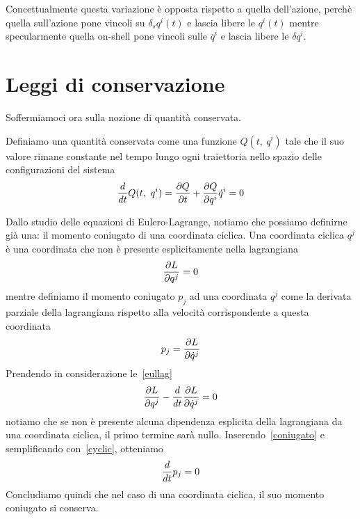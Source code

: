     Concettualmente questa variazione è opposta rispetto a quella dell'azione, perchè quella sull'azione pone vincoli su $\delta_s q^i(t)$ e lascia libere le $q^i(t)$ mentre specularmente quella on-shell pone vincoli sulle $\overline q^i$ e lascia libere le $\delta q^i$.

\section{Leggi di conservazione}
    Soffermiamoci ora sulla nozione di quantità conservata. 
    \begin{definition}
        Definiamo una quantità conservata come una funzione $Q(t, ~q^i)$ tale che il suo valore rimane constante nel tempo lungo ogni traiettoria nello spazio delle configurazioni del sistema
    \begin{equation*}
        \frac{d}{dt} Q(t, ~q^i) = \frac{\partial Q}{\partial t} + \frac{\partial Q}{\partial q^i} \dot q^i = 0
    \end{equation*}
    \end{definition} 

    Dallo studio delle equazioni di Eulero-Lagrange, notiamo che possiamo definirne già una: il momento coniugato di una coordinata ciclica. Una coordinata ciclica $q^j$ è una coordinata che non è presente esplicitamente nella lagrangiana
    \begin{equation} \label{cyclic}
        \frac{\partial L}{\partial q^j} = 0
    \end{equation}
    mentre definiamo il momento coniugato $p_j$ ad una coordinata $q^j$ come la derivata parziale della lagrangiana rispetto alla velocità corrispondente a questa coordinata
    \begin{equation} \label{coniugato}
        p_j = \frac{\partial L}{\partial\dot q^j}
    \end{equation}
    Prendendo in considerazione le~\eqref{eullag}
    \begin{equation*}
        \frac{\partial L}{\partial q^j}  - \frac{d}{dt} \frac{\partial L}{\partial\dot q^j} = 0
    \end{equation*}
    notiamo che se non è presente alcuna dipendenza esplicita della lagrangiana da una coordinata ciclica, il primo termine sarà nullo. Inserendo~\eqref{coniugato} e semplificando con~\eqref{cyclic}, otteniamo
    \begin{equation*}
        \frac{d}{dt} p_j = 0
    \end{equation*}
    Concludiamo quindi che nel caso di una coordinata ciclica, il suo momento coniugato si conserva. 

